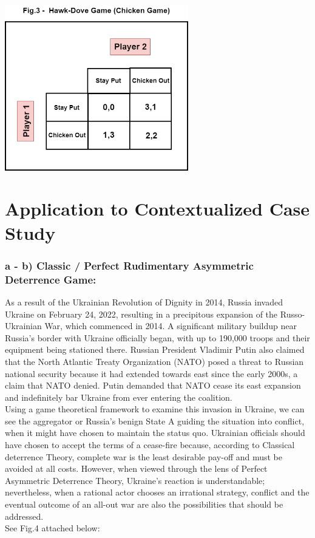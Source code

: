 \documentclass[runningheads]{llncs}
\begin{document}
\begin{center}
    \includegraphics[width=8cm]{chicken_game (Final).png}
\end{center}

\section{Application to Contextualized Case Study}
\subsubsection{a - b) Classic / Perfect Rudimentary Asymmetric Deterrence Game:}
As a result of the Ukrainian Revolution of Dignity in 2014, Russia invaded Ukraine on February 24, 2022, resulting in a precipitous expansion of the Russo-Ukrainian War, which commenced in 2014.
A significant military buildup near Russia's border with Ukraine officially began, with up to 190,000 troops and their equipment being stationed there. Russian President Vladimir Putin also claimed that the North Atlantic Treaty Organization (NATO) posed a threat to Russian national security because it had extended towards east since the early 2000s, a claim that NATO denied. Putin demanded that NATO cease its east expansion and indefinitely bar Ukraine from ever entering the coalition.\\

Using a game theoretical framework to examine this invasion in Ukraine, we can see the aggregator or Russia's benign State A guiding the situation into conflict, when it might have chosen to maintain the status quo. Ukrainian officials should have chosen to accept the terms of a cease-fire because, according to Classical deterrence Theory, complete war is the least desirable pay-off and must be avoided at all costs. However, when viewed through the lens of Perfect Asymmetric Deterrence Theory, Ukraine's reaction is understandable; nevertheless, when a rational actor chooses an irrational strategy, conflict and the eventual outcome of an all-out war are also the possibilities that should be addressed.\\
See Fig.4 attached below:
\end{document}
